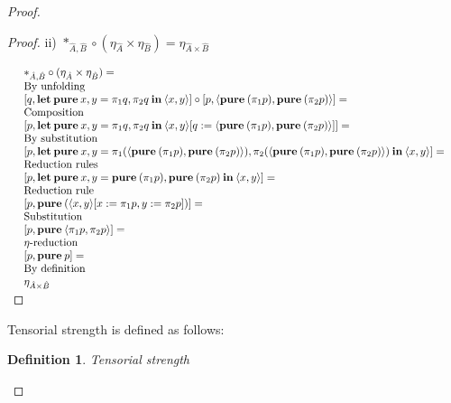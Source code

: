 \documentclass[a4paper]{article}
\newtheorem{defin}{Definition}
\begin{document}
\begin{proof}
\begin{proof}
\vspace{\baselineskip}

ii) $\ast_{\hat{A},\hat{B}} \circ (\eta_{\hat{A}} \times \eta_{\hat{B}}) = \eta_{\hat{A} \times \hat{B}}$

\vspace{\baselineskip}

$\begin{array}{lll}
& \ast_{\hat{A},\hat{B}} \circ (\eta_{\hat{A}} \times \eta_{\hat{B}}) = & \\
& \text{By unfolding} & \\
& [q, {\bf let \: pure \:} x, y = \pi_1 q, \pi_2 q {\: \bf in \:} \langle x, y \rangle] \circ [p, \langle {\bf pure \:} (\pi_1 p), {\bf pure \:} (\pi_2 p) \rangle] = & \\
& \text{Composition}& \\
& [p, {\bf let \: pure \:} x, y = \pi_1 q, \pi_2 q {\: \bf in \:} \langle x, y \rangle [q := \langle {\bf pure \:} (\pi_1 p), {\bf pure \:} (\pi_2 p) \rangle]] = & \\
& \text{By substitution}& \\
& [p, {\bf let \: pure \:} x, y = \pi_1 (\langle {\bf pure \:} (\pi_1 p), {\bf pure \:} (\pi_2 p) \rangle), \pi_2 (\langle {\bf pure \:} (\pi_1 p), {\bf pure \:} (\pi_2 p) \rangle) {\: \bf in \:} \langle x, y \rangle] = & \\
& \text{Reduction rules}& \\
& [p, {\bf let \: pure \:} x, y = {\bf pure \:} (\pi_1 p), {\bf pure \:} (\pi_2 p) {\: \bf in \:} \langle x, y \rangle] = & \\
& \text{Reduction rule}& \\
& [p, {\bf pure \:} (\langle x,y \rangle [x := \pi_1 p, y := \pi_2 p])] = & \\
& \text{Substitution}& \\
& [p, {\bf pure \:} \langle \pi_1 p, \pi_2 p \rangle] = & \\
& \text{$\eta$-reduction}& \\
& [p, {\bf pure \:} p] =& \\
& \text{By definition}& \\
& \eta_{\hat{A} \times \hat{B}}&
\end{array}$

\end{proof}

  Tensorial strength is defined as follows:

\begin{defin} Tensorial strength
  $ $


\end{defin}
\end{proof}
\end{document}

